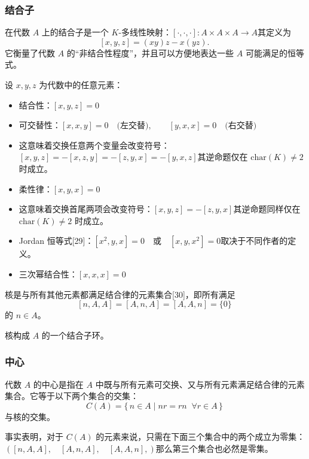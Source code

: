 \subsubsection{结合子}
在代数 $A$ 上的结合子是一个 $K$-多线性映射：$[\cdot,\cdot,\cdot] : A \times A \times A \to A$其定义为
$$
[x,y,z] = (xy)z - x(yz).~
$$
它衡量了代数 $A$ 的“非结合性程度”，并且可以方便地表达一些 $A$ 可能满足的恒等式。

设 $x, y, z$ 为代数中的任意元素：

\begin{itemize}
\item 结合性：$[x,y,z] = 0$
\item 可交替性：$[x,x,y] = 0 \quad \text{(左交替)}, \qquad [y,x,x] = 0 \quad \text{(右交替)}$
\item 这意味着交换任意两个变量会改变符号：$[x,y,z] = -[x,z,y] = -[z,y,x] = -[y,x,z]$其逆命题仅在 $\mathrm{char}(K) \neq 2$ 时成立。
\item 柔性律：$[x,y,x] = 0$
\item 这意味着交换首尾两项会改变符号：$[x,y,z] = -[z,y,x]$其逆命题同样仅在 $\mathrm{char}(K) \neq 2$ 时成立。
\item Jordan 恒等式[29]：$[x^2,y,x] = 0 \quad \text{或} \quad [x,y,x^2] = 0$取决于不同作者的定义。
\item 三次幂结合性：$[x,x,x] = 0$
\end{itemize}
核是与所有其他元素都满足结合律的元素集合[30]，即所有满足
  $$
  [n,A,A] = [A,n,A] = [A,A,n] = \{0\}~
  $$
的 $n \in A$。

核构成 $A$ 的一个结合子环。
\subsubsection{中心}
代数 $A$ 的中心是指在 $A$ 中既与所有元素可交换、又与所有元素满足结合律的元素集合。它等于以下两个集合的交集：
$$
C(A) = \{\, n \in A \mid nr = rn \;\; \forall r \in A \,\}~
$$
与核的交集。

事实表明，对于 $C(A)$ 的元素来说，只需在下面三个集合中的两个成立为零集：$([n, A, A], \quad [A, n, A], \quad [A, A, n],)$那么第三个集合也必然是零集。
